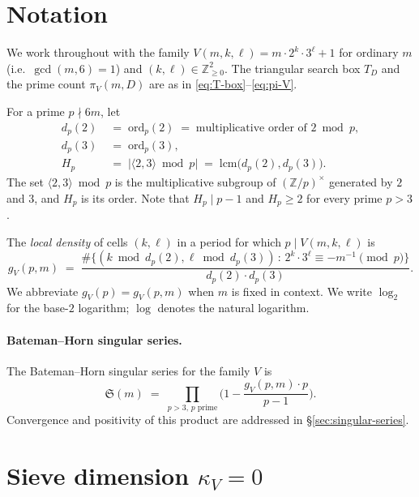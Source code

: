 \section{Notation}\label{sec:notation}

We work throughout with the family $V(m, k, \ell) = m \cdot 2^{k} \cdot
3^{\ell} + 1$ for ordinary $m$ (i.e.\ $\gcd(m, 6) = 1$) and
$(k, \ell) \in \mathbb{Z}_{\geq 0}^{2}$. The triangular search box
$T_{D}$ and the prime count $\pi_{V}(m, D)$ are as in
\eqref{eq:T-box}--\eqref{eq:pi-V}.

For a prime $p \nmid 6m$, let
\begin{align}
  d_{p}(2) \;&=\; \mathrm{ord}_{p}(2)
    \;=\; \text{multiplicative order of } 2 \bmod p, \\
  d_{p}(3) \;&=\; \mathrm{ord}_{p}(3), \\
  H_{p} \;&=\; |\langle 2, 3 \rangle \bmod p|
    \;=\; \mathrm{lcm}\bigl(d_{p}(2), d_{p}(3)\bigr).
\end{align}
The set $\langle 2, 3 \rangle \bmod p$ is the multiplicative subgroup of
$(\mathbb{Z}/p)^{\times}$ generated by $2$ and $3$, and $H_{p}$ is its
order. Note that $H_{p} \mid p - 1$ and $H_{p} \geq 2$ for every prime
$p > 3$.

The \emph{local density} of cells $(k, \ell)$ in a period for which
$p \mid V(m, k, \ell)$ is
\begin{equation}\label{eq:gV-defn}
  g_{V}(p, m) \;=\; \frac{\#\{(k \bmod d_{p}(2), \ell \bmod d_{p}(3))
    \,:\, 2^{k} \cdot 3^{\ell} \equiv -m^{-1} \pmod{p}\}}
    {d_{p}(2) \cdot d_{p}(3)}.
\end{equation}
We abbreviate $g_{V}(p) = g_{V}(p, m)$ when $m$ is fixed in context. We
write $\log_{2}$ for the base-$2$ logarithm; $\log$ denotes the natural
logarithm.

\paragraph{Bateman--Horn singular series.}
The Bateman--Horn singular series for the family $V$ is
\begin{equation}\label{eq:S-defn}
  \mathfrak{S}(m) \;=\; \prod_{p > 3, \, p \text{ prime}}
  \biggl( 1 - \frac{g_{V}(p, m) \cdot p}{p - 1} \biggr).
\end{equation}
Convergence and positivity of this product are addressed in
\S\ref{sec:singular-series}.

\section{Sieve dimension $\kappa_{V} = 0$}\label{sec:kappa}

